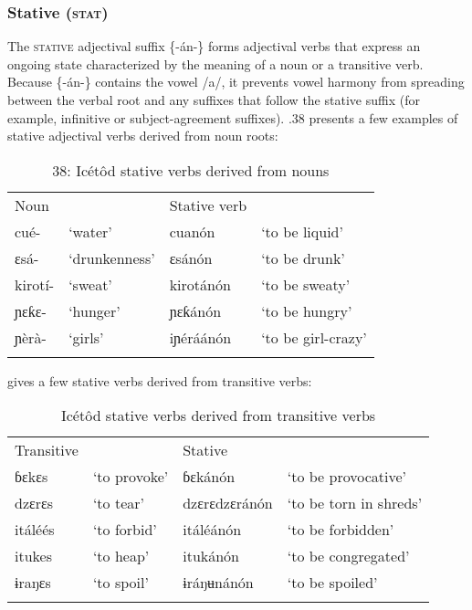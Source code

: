 \subsubsection{Stative (\textsc{stat})}

The \textsc{stative} adjectival suffix \{-án-\} forms adjectival verbs that express an ongoing state characterized by the meaning of a noun or a transitive verb. Because \{-án-\} contains the vowel /a/, it prevents vowel harmony from spreading between the verbal root and any suffixes that follow the stative suffix (for example, infinitive or subject-agreement suffixes). .38 presents a few examples of stative adjectival verbs derived from noun roots:


\begin{table}
\caption{38: Icétôd stative verbs derived from nouns}
\label{tab:8}


\begin{tabularx}{\textwidth}{XXXX}
\lsptoprule

Noun &  & Stative verb & \\
cué- & ‘water’ & cuanón & ‘to be liquid’\\
ɛsá- & ‘drunkenness’ & ɛsánón & ‘to be drunk’\\
kirotí- & ‘sweat’ & kirotánón & ‘to be sweaty’\\
ɲɛƙɛ{}- & ‘hunger’ & ɲɛƙánón & ‘to be hungry’\\
ɲèrà- & ‘girls’ & iɲéráánón & ‘to be girl-crazy’\\
\lspbottomrule
\end{tabularx}
\end{table}

 gives a few stative verbs derived from transitive verbs:
 


\begin{table}
\caption{Icétôd stative verbs derived from transitive verbs}
\label{tab:8.39}


\begin{tabularx}{\textwidth}{XXXX}
\lsptoprule

Transitive &  & Stative & \\
ɓɛkɛs & ‘to provoke’ & ɓɛkánón & ‘to be provocative’\\
dzɛrɛs & ‘to tear’ & dzɛrɛdzɛránón & ‘to be torn in shreds’\\
itáléés & ‘to forbid’ & itáléánón & ‘to be forbidden’\\
itukes & ‘to heap’ & itukánón & ‘to be congregated’\\
ɨraŋɛs & ‘to spoil’ & ɨráŋʉnánón & ‘to be spoiled’\\
\lspbottomrule
\end{tabularx}
\end{table}

